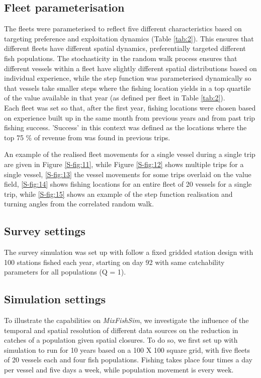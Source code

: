 \documentclass[review]{elsarticle}
\begin{document}
\subsection{Fleet parameterisation}

The fleets were parameterised to reflect five different characteristics based
on targeting preference and exploitation dynamics (Table \ref{tab:2}). This
ensures that different fleets have different spatial dynamics, preferentially
targeted different fish populations. The stochasticity in the random walk
process ensures that different vessels within a fleet have slightly different
spatial distributions based on individual experience, while the step function
was parameterised dynamically so that vessels take smaller steps where the
fishing location yields in a top quartile of the value available in that year
(as defined per fleet in Table \ref{tab:2}). \\

Each fleet was set so that, after the first year, fishing locations were chosen
based on experience built up in the same month from previous years and from
past trip fishing success. 'Success' in this context was defined as the
locations where the top 75 \% of revenue from was found in previous trips.

An example of the realised fleet movements for a single vessel during a single
trip are given in Figure \ref{S-fig:11}, while Figure \ref{S-fig:12} shows
multiple trips for a single vessel, \ref{S-fig:13} the vessel movements for
some trips overlaid on the value field, \ref{S-fig:14} shows fishing locations
for an entire fleet of 20 vessels for a single trip, while \ref{S-fig:15} shows
an example of the step function realisation and turning angles from the
correlated random walk.

\subsection{Survey settings}

The survey simulation was set up with follow a fixed gridded station design
with 100 stations fished each year, starting on day 92 with same catchability
parameters for all populations (Q = 1). 

\subsection{Simulation settings}

To illustrate the capabilities on \emph{MixFishSim}, we investigate the
influence of the temporal and spatial resolution of different data sources on
the reduction in catches of a population given spatial closures. To do so, we
first set up with simulation to run for 10 years based on a 100 X 100 square
grid, with five fleets of 20 vessels each and four fish populations. Fishing
takes place four times a day per vessel and five days a week, while population
movement is every week. \\
\end{document}
